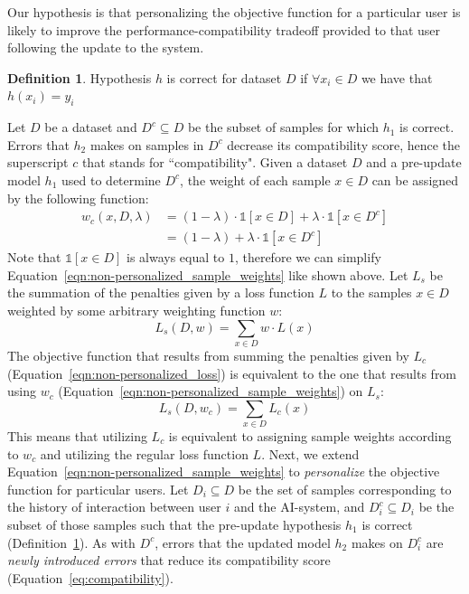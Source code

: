 \documentclass[letterpaper]{article} %
\theoremstyle{definition}
\newtheorem{definition}{Definition}
\begin{document}
Our hypothesis is that personalizing the objective function for a particular user is likely to improve the performance-compatibility tradeoff provided to that user following the update to the system.

\begin{definition}
Hypothesis  $h$  is correct for  dataset $D$ if
$\forall x_i \in D$ we have that $h(x_i)=y_i$
\label{def:hypCorrect}
\end{definition}
Let $D$ be a dataset and $D^c\subseteq D$ be the subset of samples for which $h_1$ is correct. Errors that $h_2$ makes on samples in $D^c$ decrease its compatibility score, hence the superscript $c$ that stands for ``compatibility". Given a dataset $D$ and a pre-update model $h_1$ used to determine $D^c$, the weight of each sample $x\in D$ can be assigned by the following function:
%
\begin{align}
\label{eqn:non-personalized_sample_weights}
w_c(x,D,\lambda)&=(1-\lambda)\cdot\mathbb{1}[x\in D]+\lambda\cdot\mathbb{1}[x\in D^c] \\  \nonumber
&=(1-\lambda) + \lambda\cdot\mathbb{1}[x\in D^c]
\end{align}
%
Note that $\mathbb{1}[x\in D]$ is always equal to $1$, therefore we can simplify Equation~\ref{eqn:non-personalized_sample_weights} like shown above. Let $L_s$ be the summation of the penalties given by a loss function $L$ to the samples $x\in D$ weighted by some arbitrary weighting function $w$:
\begin{equation}
\label{eqn:loss_summation}
    L_s(D,w) = \sum_{x \in D} w \cdot L(x)
\end{equation}
%
The objective function that results from summing the penalties given by $L_c$ (Equation~\ref{eqn:non-personalized_loss}) is equivalent to the one that results from using $w_c$ (Equation~\ref{eqn:non-personalized_sample_weights}) on $L_s$:
\begin{equation}
\label{eqn:Ls_equals_Lc}
    L_s(D,w_c) = \sum_{x \in D}L_c(x)
\end{equation}
%
This means that utilizing $L_c$ is equivalent to assigning sample weights according to $w_c$ and utilizing the regular loss function $L$. Next, we extend Equation~\ref{eqn:non-personalized_sample_weights} to  \textit{personalize} the objective function for  particular users.
Let $D_i\subseteq D$ be the set of samples corresponding to the  history of interaction between user $i$ and the AI-system, and $D_i^c \subseteq D_i$ be the subset of those samples such that
the pre-update hypothesis $h_1$ is correct (Definition~\ref{def:hypCorrect}). As with $D^c$, errors that the updated model $h_2$ makes on $D_i^c$ are \textit{newly introduced errors} that reduce its compatibility score (Equation~\ref{eq:compatibility}).
\end{document}
